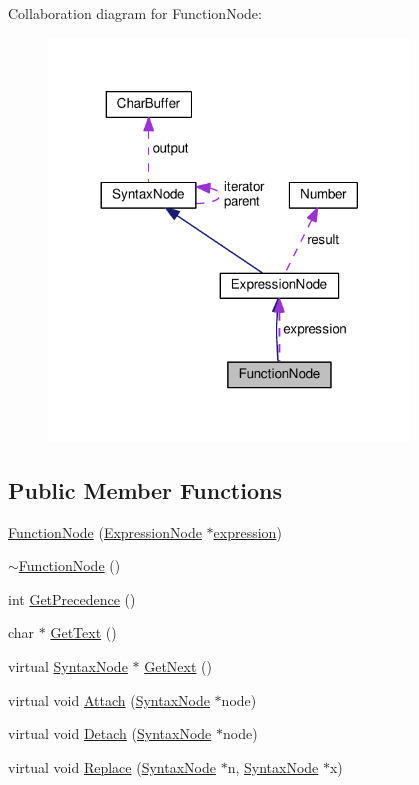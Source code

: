 Collaboration diagram for Function\+Node\+:
\nopagebreak
\begin{figure}[H]
\begin{center}
\leavevmode
\includegraphics[width=272pt]{de/d88/classFunctionNode__coll__graph}
\end{center}
\end{figure}
\subsection*{Public Member Functions}
\begin{DoxyCompactItemize}
\item 
\hyperlink{classFunctionNode_a41cb7db0162ffbec0902bd8ff7ea435f}{Function\+Node} (\hyperlink{classExpressionNode}{Expression\+Node} $\ast$\hyperlink{classFunctionNode_ad7577b179a1937aaf8a0058bb5b546dc}{expression})
\item 
\hyperlink{classFunctionNode_a24ca76ed6585311b7ee49534f11dbc78}{$\sim$\+Function\+Node} ()
\item 
int \hyperlink{classFunctionNode_a410288c74db880d2d3bffadc393d9ede}{Get\+Precedence} ()
\item 
char $\ast$ \hyperlink{classFunctionNode_a86b42caf0a4019d8f594dc994bb094e7}{Get\+Text} ()
\item 
virtual \hyperlink{classSyntaxNode}{Syntax\+Node} $\ast$ \hyperlink{classFunctionNode_a8f6d3631e6b06af048a87463f34f0b8e}{Get\+Next} ()
\item 
virtual void \hyperlink{classFunctionNode_aec646af849e98f7aee604398dccf1385}{Attach} (\hyperlink{classSyntaxNode}{Syntax\+Node} $\ast$node)
\item 
virtual void \hyperlink{classFunctionNode_a3af90509cddcec47bdf454665c622412}{Detach} (\hyperlink{classSyntaxNode}{Syntax\+Node} $\ast$node)
\item 
virtual void \hyperlink{classFunctionNode_a951101d50e4b4428871986923d5657d8}{Replace} (\hyperlink{classSyntaxNode}{Syntax\+Node} $\ast$n, \hyperlink{classSyntaxNode}{Syntax\+Node} $\ast$x)
\end{DoxyCompactItemize}
